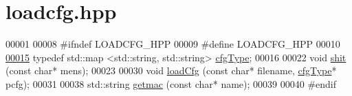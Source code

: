 \hypertarget{loadcfg_8hpp_source}{}\section{loadcfg.\+hpp}
\label{loadcfg_8hpp_source}

\begin{DoxyCode}
00001 
00008 \textcolor{preprocessor}{#ifndef LOADCFG\_HPP}
00009 \textcolor{preprocessor}{#define LOADCFG\_HPP}
00010 
\hyperlink{loadcfg_8hpp_a3bc0e674227412446fc364a733cebde6}{00015} \textcolor{keyword}{typedef}  std::map <std::string, std::string> \hyperlink{loadcfg_8hpp_a3bc0e674227412446fc364a733cebde6}{cfgType};
00016 
00022 \textcolor{keywordtype}{void} \hyperlink{loadcfg_8hpp_a91f772c379dc1d6c6088d077aa722574}{shit} (\textcolor{keyword}{const} \textcolor{keywordtype}{char}* mens);
00023 
00030 \textcolor{keywordtype}{void} \hyperlink{loadcfg_8hpp_a4667fdb45ba6b04ab678f894e58a2fcb}{loadCfg} (\textcolor{keyword}{const} \textcolor{keywordtype}{char}* filename, \hyperlink{loadcfg_8hpp_a3bc0e674227412446fc364a733cebde6}{cfgType}* pcfg);
00031 
00038 std::string \hyperlink{loadcfg_8hpp_ae4db05d33445e6b6ca0c4a6a0ba23bf3}{getmac} (\textcolor{keyword}{const} \textcolor{keywordtype}{char}* name);
00039 
00040 \textcolor{preprocessor}{#endif}
\end{DoxyCode}
